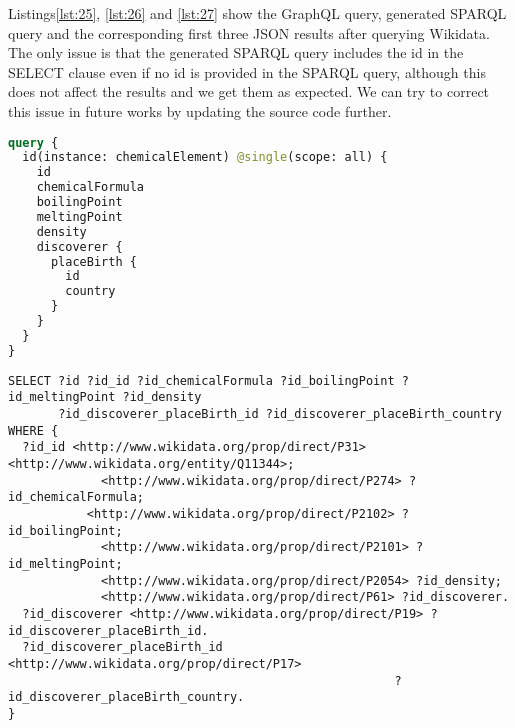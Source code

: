 Listings\ref{lst:25}, \ref{lst:26} and \ref{lst:27} show the GraphQL query, generated SPARQL query and the corresponding first three JSON results after querying Wikidata. The only issue is that the generated SPARQL query includes the id in the SELECT clause even if no id is provided in the SPARQL query, although this does not affect the results and we get them as expected. We can try to correct this issue in future works by updating the source code further.

\begin{minipage}{\linewidth}
\begin{lstlisting}[label=lst:25, caption={GraphQL Query using Solution 2}, language=GraphQL]
query {
  id(instance: chemicalElement) @single(scope: all) {
    id
    chemicalFormula
    boilingPoint
    meltingPoint
    density
    discoverer {
      placeBirth {
        id
        country
      }
    }
  }
}
\end{lstlisting}
\end{minipage}

\begin{minipage}{\linewidth}
\begin{lstlisting}[columns=fullflexible, label=lst:26, caption={Generated SPARQL Query}, language=SPARQL]
SELECT ?id ?id_id ?id_chemicalFormula ?id_boilingPoint ?id_meltingPoint ?id_density
       ?id_discoverer_placeBirth_id ?id_discoverer_placeBirth_country WHERE {
  ?id_id <http://www.wikidata.org/prop/direct/P31> <http://www.wikidata.org/entity/Q11344>;
    		 <http://www.wikidata.org/prop/direct/P274> ?id_chemicalFormula;
    	   <http://www.wikidata.org/prop/direct/P2102> ?id_boilingPoint;
    		 <http://www.wikidata.org/prop/direct/P2101> ?id_meltingPoint;
    		 <http://www.wikidata.org/prop/direct/P2054> ?id_density;
    		 <http://www.wikidata.org/prop/direct/P61> ?id_discoverer.
  ?id_discoverer <http://www.wikidata.org/prop/direct/P19> ?id_discoverer_placeBirth_id.
  ?id_discoverer_placeBirth_id <http://www.wikidata.org/prop/direct/P17>
                                                      ?id_discoverer_placeBirth_country.
}
\end{lstlisting}
\end{minipage}

